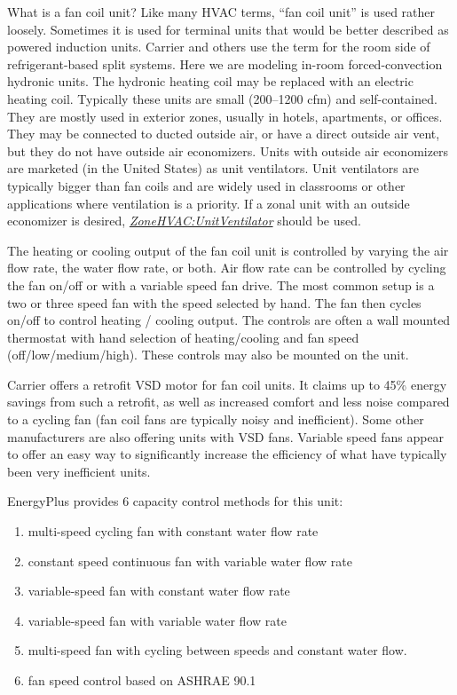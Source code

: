 What is a fan coil unit? Like many HVAC terms, ``fan coil unit'' is used rather loosely. Sometimes it is used for terminal units that would be better described as powered induction units. Carrier and others use the term for the room side of refrigerant-based split systems. Here we are modeling in-room forced-convection hydronic units. The hydronic heating coil may be replaced with an electric heating coil. Typically these units are small (200--1200 cfm) and self-contained. They are mostly used in exterior zones, usually in hotels, apartments, or offices. They may be connected to ducted outside air, or have a direct outside air vent, but they do not have outside air economizers. Units with outside air economizers are marketed (in the United States) as unit ventilators. Unit ventilators are typically bigger than fan coils and are widely used in classrooms or other applications where ventilation is a priority. If a zonal unit with an outside economizer is desired, \emph{\hyperref[zonehvacunitventilator]{ZoneHVAC:UnitVentilator}} should be used.

The heating or cooling output of the fan coil unit is controlled by varying the air flow rate, the water flow rate, or both. Air flow rate can be controlled by cycling the fan on/off or with a variable speed fan drive. The most common setup is a two or three speed fan with the speed selected by hand. The fan then cycles on/off to control heating / cooling output. The controls are often a wall mounted thermostat with hand selection of heating/cooling and fan speed (off/low/medium/high). These controls may also be mounted on the unit.

Carrier offers a retrofit VSD motor for fan coil units. It claims up to 45\% energy savings from such a retrofit, as well as increased comfort and less noise compared to a cycling fan (fan coil fans are typically noisy and inefficient). Some other manufacturers are also offering units with VSD fans. Variable speed fans appear to offer an easy way to significantly increase the efficiency of what have typically been very inefficient units.

EnergyPlus provides 6 capacity control methods for this unit:

\begin{enumerate}
\def\labelenumi{\arabic{enumi}.}
\item
  multi-speed cycling fan with constant water flow rate
\item
  constant speed continuous fan with variable water flow rate
\item
  variable-speed fan with constant water flow rate
\item
  variable-speed fan with variable water flow rate
\item
  multi-speed fan with cycling between speeds and constant water flow.
\item
  fan speed control based on ASHRAE 90.1
\end{enumerate}

